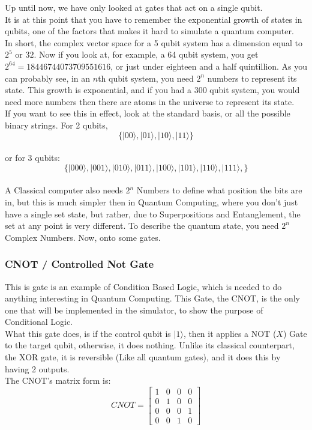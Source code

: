 \documentclass[../main.tex]{subfiles}
\begin{document}
Up until now, we have only looked at gates that act on a single qubit.\\
It is at this point that you have to remember the exponential growth of
states in qubits, one of the factors that makes it hard to simulate a
quantum computer.\\
In short, the complex vector space for a 5 qubit system has a dimension
equal to \(2^5\) or \(32\). Now if you look at, for example, a 64 qubit
system, you get \(2^64 = 18446744073709551616\), or just under eighteen
and a half quintillion. As you can probably see, in an \(n\)th qubit
system, you need \(2^n\) numbers to represent its state. This growth is
exponential, and if you had a \(300\) qubit system, you would need more
numbers then there are atoms in the universe to represent its state.\\
If you want to see this in effect, look at the standard basis, or all
the possible binary strings. For 2 qubits,\\
\[
\{\lvert00\rangle, \lvert01\rangle, \lvert10\rangle, \lvert11\rangle\}\]\\
or for 3 qubits:\\
\[
\{\lvert000\rangle, \lvert001\rangle, \lvert010\rangle, \lvert011\rangle, \lvert100\rangle, \lvert101\rangle, \lvert110\rangle, \lvert111\rangle,\}\]\\
A Classical computer also needs \(2^n\) Numbers to define what position
the bits are in, but this is much simpler then in Quantum Computing,
where you don't just have a single set state, but rather, due to
Superpositions and Entanglement, the set at any point is very different.
To describe the quantum state, you need \(2^n\) Complex Numbers. Now,
onto some gates.

\subsubsection{CNOT / Controlled Not Gate}

This is gate is an example of Condition Based Logic, which is needed to
do anything interesting in Quantum Computing. This Gate, the CNOT, is
the only one that will be implemented in the simulator, to show the
purpose of Conditional Logic. \\
What this gate does, is if the control qubit is \(\lvert1\rangle\), then it
applies a NOT (\(X\)) Gate to the target qubit, otherwise, it does
nothing. Unlike its classical counterpart, the XOR gate, it is
reversible (Like all quantum gates), and it does this by having 2
outputs.\\
The CNOT's matrix form is:\\
\begin{equation}
	CNOT = \left[ \begin{matrix} 1 & 0 & 0 & 0 \\ 0 & 1 & 0 & 0 \\ 0     & 0 & 0 & 1 \\ 0 & 0 & 1  & 0\end{matrix} \right]
\end{equation}
\end{document}
